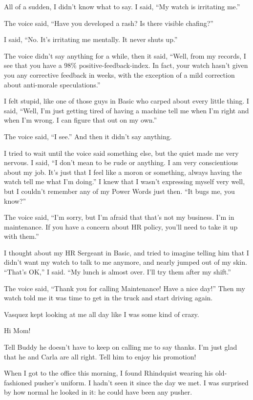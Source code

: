 All of a sudden, I didn't know what to say. I said, “My watch is 
irritating me.”

The voice said, “Have you developed a rash? Is there visible 
chafing?”

I said, “No. It's irritating me mentally. It never shuts up.”

The voice didn't say anything for a while, then it said, “Well, from 
my records, I see that you have a 98\% positive-feedback-index. In 
fact, your watch hasn't given you any corrective feedback in weeks, 
with the exception of a mild correction about anti-morale 
speculations.”

I felt stupid, like one of those guys in Basic who carped about every 
little thing. I said, “Well, I'm just getting tired of having a 
machine tell me when I'm right and when I'm wrong. I can figure that 
out on my own.”

The voice said, “I see.” And then it didn't say anything.

I tried to wait until the voice said something else, but the quiet made 
me very nervous. I said, “I don't mean to be rude or anything. I am 
very conscientious about my job. It's just that I feel like a moron or 
something, always having the watch tell me what I'm doing.” I knew 
that I wasn't expressing myself very well, but I couldn't remember any 
of my Power Words just then. “It bugs me, you know?”

The voice said, “I'm sorry, but I'm afraid that that's not my 
business. I'm in maintenance. If you have a concern about HR policy, 
you'll need to take it up with them.”

I thought about my HR Sergeant in Basic, and tried to imagine telling 
him that I didn't want my watch to talk to me anymore, and nearly 
jumped out of my skin. “That's OK,” I said. “My lunch is almost 
over. I'll try them after my shift.”

The voice said, “Thank you for calling Maintenance! Have a nice 
day!” Then my watch told me it was time to get in the truck and start 
driving again.

Vasquez kept looking at me all day like I was some kind of crazy.

\tb

Hi Mom!

Tell Buddy he doesn't have to keep on calling me to say thanks. I'm 
just glad that he and Carla are all right. Tell him to enjoy his 
promotion!

When I got to the office this morning, I found Rhindquist wearing his 
old-fashioned pusher's uniform. I hadn't seen it since the day we met. 
I was surprised by how normal he looked in it: he could have been any 
pusher.


